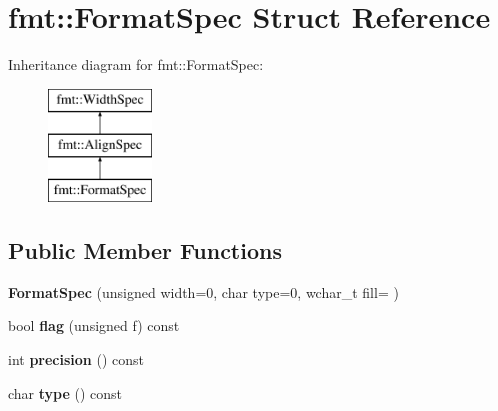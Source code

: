\hypertarget{structfmt_1_1FormatSpec}{}\section{fmt\+:\+:Format\+Spec Struct Reference}
\label{structfmt_1_1FormatSpec}
Inheritance diagram for fmt\+:\+:Format\+Spec\+:\begin{figure}[H]
\begin{center}
\leavevmode
\includegraphics[height=3.000000cm]{structfmt_1_1FormatSpec}
\end{center}
\end{figure}
\subsection*{Public Member Functions}
\begin{DoxyCompactItemize}
\item 
{\bfseries Format\+Spec} (unsigned width=0, char type=0, wchar\+\_\+t fill= \textquotesingle{} \textquotesingle{})\hypertarget{structfmt_1_1FormatSpec_a6a434aa4ea0d694e10b079b4e52ffe97}{}\label{structfmt_1_1FormatSpec_a6a434aa4ea0d694e10b079b4e52ffe97}

\item 
bool {\bfseries flag} (unsigned f) const \hypertarget{structfmt_1_1FormatSpec_a2ee0e9bf9979641418a8b30b4e7740f2}{}\label{structfmt_1_1FormatSpec_a2ee0e9bf9979641418a8b30b4e7740f2}

\item 
int {\bfseries precision} () const \hypertarget{structfmt_1_1FormatSpec_a4d48f0000dc495b3cc1c6f222e2036a9}{}\label{structfmt_1_1FormatSpec_a4d48f0000dc495b3cc1c6f222e2036a9}

\item 
char {\bfseries type} () const \hypertarget{structfmt_1_1FormatSpec_a4da20f7a988a694ce02f01d1ffb3d783}{}\label{structfmt_1_1FormatSpec_a4da20f7a988a694ce02f01d1ffb3d783}

\end{DoxyCompactItemize}
